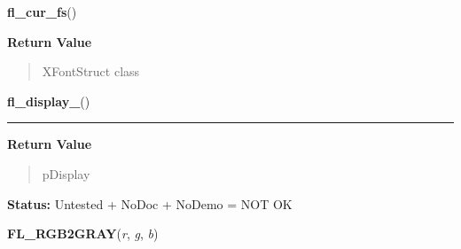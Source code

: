     \vspace{0.5ex}

\hspace{.8\funcindent}\begin{boxedminipage}{\funcwidth}

    \raggedright \textbf{fl\_cur\_fs}()

\setlength{\parskip}{2ex}
\setlength{\parskip}{1ex}
      \textbf{Return Value}
    \vspace{-1ex}

      \begin{quote}
      XFontStruct class

      \end{quote}

    \end{boxedminipage}

    \label{xformslib:library:fl_display_}

    \vspace{0.5ex}

\hspace{.8\funcindent}\begin{boxedminipage}{\funcwidth}

    \raggedright \textbf{fl\_display\_}()

    \vspace{-1.5ex}

    \rule{\textwidth}{0.5\fboxrule}
\setlength{\parskip}{2ex}
\setlength{\parskip}{1ex}
      \textbf{Return Value}
    \vspace{-1ex}

      \begin{quote}
      pDisplay

      \end{quote}

\textbf{Status:} Untested + NoDoc + NoDemo = NOT OK



    \end{boxedminipage}

    \label{xformslib:library:FL_RGB2GRAY}

    \vspace{0.5ex}

\hspace{.8\funcindent}\begin{boxedminipage}{\funcwidth}

    \raggedright \textbf{FL\_RGB2GRAY}(\textit{r}, \textit{g}, \textit{b})

\setlength{\parskip}{2ex}
\setlength{\parskip}{1ex}
    \end{boxedminipage}

